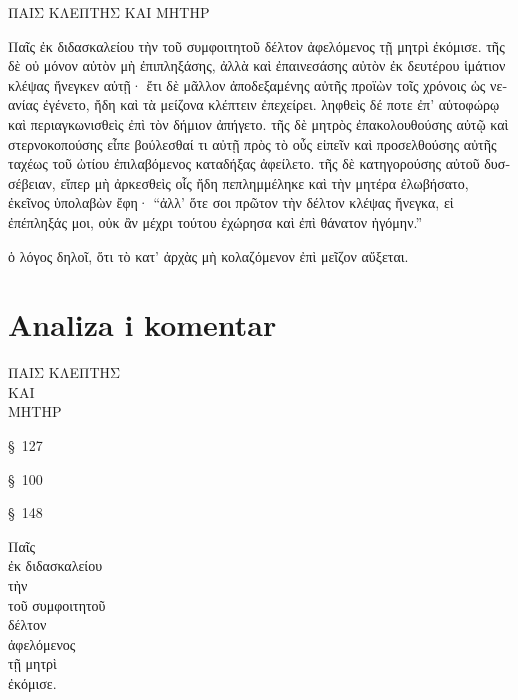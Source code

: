 {\large
\begin{greek}
\noindent ΠΑΙΣ ΚΛΕΠΤΗΣ ΚΑΙ ΜΗΤΗΡ 

\medskip

\noindent Παῖς ἐκ διδασκαλείου τὴν τοῦ συμφοιτητοῦ δέλτον ἀφελόμενος τῇ μητρὶ ἐκόμισε. τῆς δὲ οὐ μόνον αὐτὸν μὴ ἐπιπληξάσης, ἀλλὰ καὶ ἐπαινεσάσης αὐτὸν ἐκ δευτέρου ἱμάτιον κλέψας ἤνεγκεν αὐτῇ· ἔτι δὲ μᾶλλον ἀποδεξαμένης αὐτῆς προϊὼν τοῖς χρόνοις ὡς νεανίας ἐγένετο, ἤδη καὶ τὰ μείζονα κλέπτειν  ἐπεχείρει. ληφθεὶς δέ ποτε ἐπ' αὐτοφώρῳ καὶ περιαγκωνισθεὶς ἐπὶ τὸν δήμιον ἀπήγετο. τῆς δὲ μητρὸς ἐπακολουθούσης αὐτῷ καὶ στερνοκοπούσης εἶπε βούλεσθαί τι αὐτῇ πρὸς τὸ οὖς εἰπεῖν καὶ προσελθούσης αὐτῆς ταχέως τοῦ ὠτίου ἐπιλαβόμενος καταδήξας ἀφείλετο. τῆς δὲ κατηγορούσης αὐτοῦ δυσσέβειαν, εἴπερ μὴ ἀρκεσθεὶς οἷς ἤδη πεπλημμέληκε καὶ τὴν μητέρα ἐλωβήσατο, ἐκεῖνος ὑπολαβὼν ἔφη· ``ἀλλ' ὅτε σοι πρῶτον τὴν δέλτον κλέψας ἤνεγκα, εἰ ἐπέπληξάς μοι, οὐκ ἂν μέχρι τούτου ἐχώρησα καὶ ἐπὶ θάνατον ἠγόμην.''

ὁ λόγος δηλοῖ, ὅτι τὸ κατ' ἀρχὰς μὴ κολαζόμενον ἐπὶ μεῖζον αὔξεται. 
\end{greek}

}


\section*{Analiza i komentar}


{\large
\noindent ΠΑΙΣ ΚΛΕΠΤΗΣ \\
ΚΑΙ \\
ΜΗΤΗΡ\\

}

\begin{description}[noitemsep]

\item[ΠΑΙΣ] §~127
\item[ΚΛΕΠΤΗΣ] §~100
\item[ΜΗΤΗΡ] §~148
\end{description}

{\large
\noindent Παῖς \\ 
\tabto{2em} ἐκ διδασκαλείου\\ 
τὴν \\
\tabto{2em} τοῦ συμφοιτητοῦ \\
δέλτον \\
ἀφελόμενος\\ 
\tabto{2em} τῇ μητρὶ \\
ἐκόμισε.\\

}


